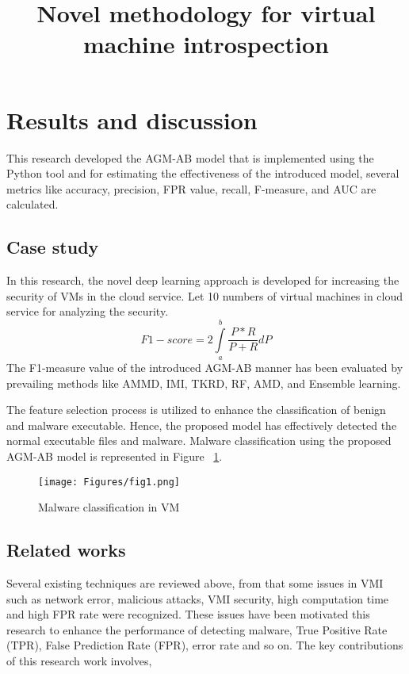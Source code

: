 \documentclass{gji}
\begin{document}
\tableofcontents
\newpage

\title{Novel methodology for virtual machine introspection}

\section{Results and discussion }
This research developed the AGM-AB model that is implemented using the Python tool and for estimating the effectiveness of the introduced model, several metrics like accuracy, precision, FPR value, recall, F-measure, and AUC are calculated.

\subsection{Case study}
In this research, the novel deep learning approach is developed for increasing the security of VMs in the cloud service. Let 10 numbers of virtual machines in cloud service for analyzing the security. 
$$
F1 - score= 2 \int\limits_a^b \frac{P*R}{P+R}dP
$$
The F1-measure value of the introduced AGM-AB manner has been evaluated by prevailing methods like AMMD, IMI, TKRD, RF, AMD, and Ensemble learning.
\par The feature selection process is utilized to enhance the classification of benign and malware executable. Hence, the proposed model has effectively detected the normal executable files and malware. Malware classification using the proposed AGM-AB model is represented in Figure ~\ref{Figure 1:image}.
\begin{figure}
  \centering
  \texttt{[image: Figures/fig1.png]}
  \caption{Malware classification in VM}
  \label{Figure 1:image}
\end{figure}

\subsection{Related works}
Several existing techniques are reviewed above, from that some issues in VMI such as network error, malicious attacks, VMI security, high computation time and high FPR rate were recognized. These issues have been motivated this research to enhance the performance of detecting malware, True Positive Rate (TPR), False Prediction Rate (FPR), error rate and so on. The key contributions of this research work involves,
\end{document}
